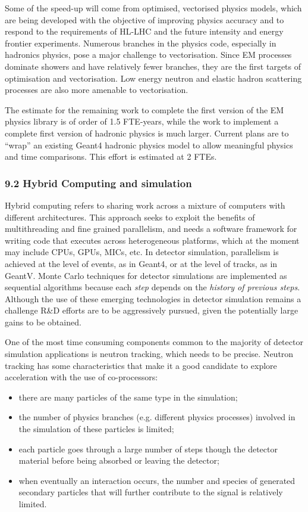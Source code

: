 \documentclass[12pt,a4paper]{article}
\begin{document}
Some of the speed-up will come from optimised, vectorised physics
models, which are being developed with the objective of improving
physics accuracy and to respond to the requirements of HL-LHC and the
future intensity and energy frontier experiments. Numerous branches in
the physics code, especially in hadronics physics, pose a major
challenge to vectorisation. Since EM processes dominate showers and have
relatively fewer branches, they are the first targets of optimisation
and vectorisation. Low energy neutron and elastic hadron scattering
processes are also more amenable to vectorisation.

The estimate for the remaining work to complete the first version of the
EM physics library is of order of 1.5 FTE-years, while the work to
implement a complete first version of hadronic physics is much larger.
Current plans are to ``wrap'' an existing Geant4 hadronic physics model
to allow meaningful physics and time comparisons. This effort is
estimated at 2 FTEs.

\hypertarget{hybrid-computing-and-simulation}{%
\subsubsection{9.2 Hybrid Computing and
simulation}\label{hybrid-computing-and-simulation}}

Hybrid computing refers to sharing work across a mixture of computers
with different architectures. This approach seeks to exploit the
benefits of multithreading and fine grained parallelism, and needs a
software framework for writing code that executes across heterogeneous
platforms, which at the moment may include CPUs, GPUs, MICs, etc. In
detector simulation, parallelism is achieved at the level of events, as
in Geant4, or at the level of tracks, as in GeantV. Monte Carlo
techniques for detector simulations are implemented as sequential
algorithms because each \emph{step} depends on the \emph{history of
previous steps}. Although the use of these emerging technologies in
detector simulation remains a challenge R\&D efforts are to be
aggressively pursued, given the potentially large gains to be obtained.

One of the most time consuming components common to the majority of
detector simulation applications is neutron tracking, which needs to be
precise. Neutron tracking has some characteristics that make it a good
candidate to explore acceleration with the use of co-processors:

\begin{itemize}
\item
  there are many particles of the same type in the simulation;
\item
  the number of physics branches (e.g. different physics processes)
  involved in the simulation of these particles is limited;
\item
  each particle goes through a large number of steps though the detector
  material before being absorbed or leaving the detector;
\item
  when eventually an interaction occurs, the number and species of
  generated secondary particles that will further contribute to the
  signal is relatively limited.
\end{itemize}
\end{document}
